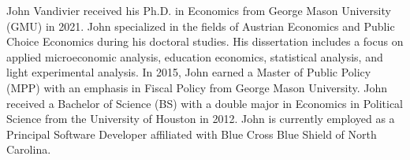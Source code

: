 \documentclass[11 pt]{report}
\begin{document}




\cvpage

\noindent John Vandivier received his Ph.D. in Economics from George Mason University (GMU) in 2021.
John specialized in the fields of Austrian Economics and Public Choice Economics during his doctoral studies.
His dissertation includes a focus on applied microeconomic analysis, education economics, statistical analysis, and light experimental analysis.
In 2015, John earned a Master of Public Policy (MPP) with an emphasis in Fiscal Policy from George Mason University.
John received a Bachelor of Science (BS) with a double major in Economics in Political Science from the University of Houston in 2012.
John is currently employed as a Principal Software Developer affiliated with Blue Cross Blue Shield of North Carolina.
\end{document}
